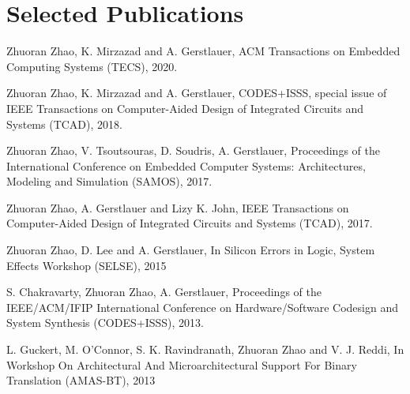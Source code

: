 \documentclass[letterpaper,11pt]{article}
\begin{document}
\section{Selected Publications}
\begin{enumerate}[label={[\arabic*]}, leftmargin=*]

  \item \label{NoSDSE} {{Zhuoran Zhao}, K. Mirzazad and A. Gerstlauer,  
    {ACM Transactions on Embedded Computing Systems (TECS), 2020.} \vspace{-3pt}}
  \item \label{DeepThings} {{Zhuoran Zhao}, K. Mirzazad and A. Gerstlauer,  
    {CODES+ISSS, special issue of IEEE Transactions on Computer-Aided Design of Integrated Circuits and Systems (TCAD), 2018.} \vspace{-3pt}}
  \item \label{NoSSim} {{Zhuoran Zhao}, V. Tsoutsouras, D. Soudris, A. Gerstlauer,  
    {Proceedings of the International Conference on Embedded Computer Systems: Architectures, Modeling and Simulation (SAMOS), 2017.} \vspace{-3pt}}
  \item \label{PERPT} {{Zhuoran Zhao}, A. Gerstlauer and Lizy K. John,  
    {IEEE Transactions on Computer-Aided Design of Integrated Circuits and Systems (TCAD), 2017.} \vspace{-3pt}}
  \item \label{Web} {Zhuoran Zhao, D. Lee and A. Gerstlauer,  
    {In Silicon Errors in Logic, System Effects Workshop (SELSE), 2015} \vspace{-3pt}}
  \item \label{RBA} {S. Chakravarty, { Zhuoran Zhao}, A. Gerstlauer,  
    {Proceedings of the IEEE/ACM/IFIP International Conference on Hardware/Software Codesign and System Synthesis (CODES+ISSS), 2013.} \vspace{-3pt}}
  \item \label{Web} {L. Guckert, M. O'Connor, S. K. Ravindranath, { Zhuoran Zhao} and V. J. Reddi,  
    {In Workshop On Architectural And Microarchitectural Support For Binary Translation (AMAS-BT), 2013} \vspace{-3pt}}


\end{enumerate}
\end{document}
